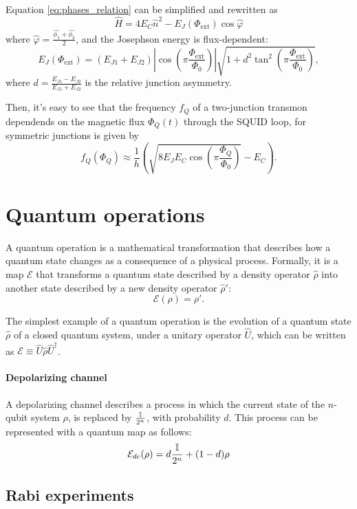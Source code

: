 Equation \ref{eq:phases_relation} can be simplified and rewritten as 
\begin{equation}\label{eq:tunable_transmon_hamiltonian}
    \hat{H} = 4E_C\hat{n}^2 - E_J(\Phi_{\text{ext}})\cos{\hat{\varphi}}
\end{equation}
where $\hat{\varphi} = \frac{\hat{\phi_1}+\hat{\phi_2}}{2}$, and the Josephson energy is flux-dependent: 
\begin{equation}\label{eq:EJ_tunable}
    E_J(\Phi_{\text{ext}}) = (E_{J1} + E_{J2}) \left| \cos \left( \pi \frac{\Phi_{\text{ext}}}{\Phi_0} \right) \right| \sqrt{1 + d^2 \tan^2 \left( \pi \frac{\Phi_{\text{ext}}}{\Phi_0} \right) },
\end{equation}
where $d = \frac{E_{J1}-E_{J2}}{E_{J1}+E_{J2}}$ is the relative junction asymmetry.

Then, it's easy to see that the frequency $f_Q$ of a two-junction transmon dependends on the magnetic flux $\Phi_Q(t)$ through the SQUID loop, for symmetric junctions is given by
\begin{equation}\label{eq:freqdepndenceonflux}
    f_Q(\Phi_Q) \approx \frac{1}{h} \left( \sqrt{8E_J E_C \cos\left(\pi \frac{\Phi_Q}{\Phi_0} \right)} - E_C \right).    
\end{equation}

\section{Quantum operations}
A quantum operation is a mathematical transformation that describes how a quantum state changes as a consequence of a physical process. Formally, it is a map $\mathcal{E}$ that transforms a quantum state described by a density operator $\hat{\rho}$ into another state described by a new density operator $\hat{\rho}'$:
\begin{equation}
    \mathcal{E}(\rho) = \rho'\label{eq:quantum_map}.
\end{equation}

The simplest example of a quantum operation is the evolution of a quantum state $\hat{\rho}$ of a closed quantum system, under a unitary operator $\hat{U}$, which can be written as $\mathcal{E} \equiv \hat{U} \hat{\rho} \hat{U}^{\dagger}$.

\paragraph{Depolarizing channel}
A depolarizing channel describes a process in which the current state of the $n$-qubit system $\rho$, is replaced by $\frac{\mathbb{I}}{2^n}$, with probability $d$. This process can be represented with a quantum map as follows:
\begin{equation}
    \mathcal{E}_{dc}(\rho) = d\frac{\mathbb{I}}{2^n}+(1-d)\rho\label{eq:depolarizing_channel}
\end{equation} 


\subsection{Rabi experiments}


